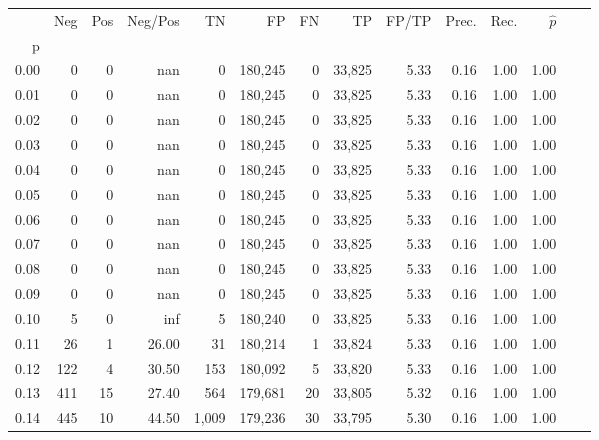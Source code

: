 \begin{tabular}{rrrrrrrrrrrrrr}
\toprule
{} &     Neg &    Pos & Neg/Pos &       TN &       FP &      FN &      TP & FP/TP & Prec. &  Rec. & $\hat{p}$ \\
p    &         &        &         &          &          &         &         &       &       &       &           \\
\midrule
0.00 &       0 &      0 &     nan &        0 &  180,245 &       0 &  33,825 &  5.33 &  0.16 &  1.00 &      1.00 \\
0.01 &       0 &      0 &     nan &        0 &  180,245 &       0 &  33,825 &  5.33 &  0.16 &  1.00 &      1.00 \\
0.02 &       0 &      0 &     nan &        0 &  180,245 &       0 &  33,825 &  5.33 &  0.16 &  1.00 &      1.00 \\
0.03 &       0 &      0 &     nan &        0 &  180,245 &       0 &  33,825 &  5.33 &  0.16 &  1.00 &      1.00 \\
0.04 &       0 &      0 &     nan &        0 &  180,245 &       0 &  33,825 &  5.33 &  0.16 &  1.00 &      1.00 \\
0.05 &       0 &      0 &     nan &        0 &  180,245 &       0 &  33,825 &  5.33 &  0.16 &  1.00 &      1.00 \\
0.06 &       0 &      0 &     nan &        0 &  180,245 &       0 &  33,825 &  5.33 &  0.16 &  1.00 &      1.00 \\
0.07 &       0 &      0 &     nan &        0 &  180,245 &       0 &  33,825 &  5.33 &  0.16 &  1.00 &      1.00 \\
0.08 &       0 &      0 &     nan &        0 &  180,245 &       0 &  33,825 &  5.33 &  0.16 &  1.00 &      1.00 \\
0.09 &       0 &      0 &     nan &        0 &  180,245 &       0 &  33,825 &  5.33 &  0.16 &  1.00 &      1.00 \\
0.10 &       5 &      0 &     inf &        5 &  180,240 &       0 &  33,825 &  5.33 &  0.16 &  1.00 &      1.00 \\
0.11 &      26 &      1 &   26.00 &       31 &  180,214 &       1 &  33,824 &  5.33 &  0.16 &  1.00 &      1.00 \\
0.12 &     122 &      4 &   30.50 &      153 &  180,092 &       5 &  33,820 &  5.33 &  0.16 &  1.00 &      1.00 \\
0.13 &     411 &     15 &   27.40 &      564 &  179,681 &      20 &  33,805 &  5.32 &  0.16 &  1.00 &      1.00 \\
0.14 &     445 &     10 &   44.50 &    1,009 &  179,236 &      30 &  33,795 &  5.30 &  0.16 &  1.00 &      1.00 \\

\end{tabular}
